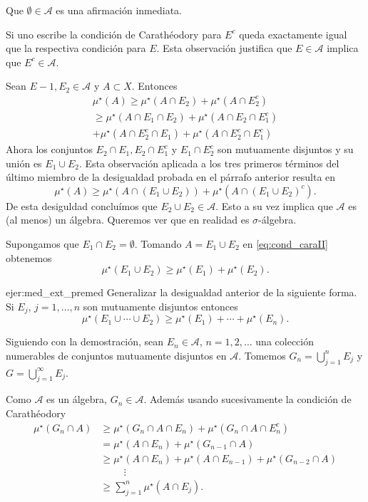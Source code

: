  \begin{demo} Que $\emptyset\in\mathscr{A}$ es una afirmación inmediata. 
 
 Si uno escribe la condición de Carathéodory para $E^c$ queda exactamente igual que la respectiva condición para $E$. Esta observación justifica que $E\in \mathscr{A}$ implica que $E^c\in\mathscr{A}$.
 
 Sean $E-1,E_2\in\mathscr{A}$ y $A\subset X$. Entonces
 \begin{multline*}
  \mu^\star(A)\geq  \mu^\star(A\cap E_2)+ \mu^\star(A\cap E_2^c)\\
  \geq \mu^\star(A\cap E_1\cap E_2)+ \mu^\star(A\cap E_2\cap E_1^c)\\
  + \mu^\star(A\cap E_2^c\cap E_1)+ \mu^\star(A\cap E_2^c\cap E_1^c)
 \end{multline*} 
Ahora los conjuntos $E_2\cap E_1, E_2\cap E_1^c$ y $E_1\cap E_2^c$ son mutuamente disjuntos  y su unión es $E_1\cup E_2$. Esta observación aplicada a los tres primeros términos del último miembro de la desigualdad probada en el párrafo anterior resulta en 
\[
  \mu^\star(A)\geq \mu^\star(A\cap (E_1\cup E_2))+ \mu^\star(A\cap (E_1\cup E_2)^c).
\]
De esta desiguldad concluímos que $E_2\cup E_2\in\mathscr{A}$. Esto a su vez implica que $\mathscr{A}$ es (al menos) un álgebra. Queremos ver que en realidad es $\sigma$-álgebra.

Supongamos que $E_1\cap E_2=\emptyset$. Tomando $A= E_1\cup E_2$ en \eqref{eq:cond_caraII} obtenemos
\[
 \mu^\star(E_1\cup E_2)\geq \mu^\star(E_1)+\mu^\star(E_2).
 \]

\begin{ejercicio}{ejer:med_ext_premed} Generalizar la desigualdad anterior de la siguiente forma. Si $E_j$, $j=1,\ldots,n$ son mutuamente disjuntos entonces
\[
 \mu^\star(E_1\cup\cdots\cup E_2)\geq \mu^\star(E_1)+\cdots+\mu^\star(E_n).
 \]
 \end{ejercicio}

Siguiendo con la demostración, sean $E_n\in\mathscr{A}$, $n=1,2,\ldots$ una colección numerables de conjuntos mutuamente disjuntos en $\mathscr{A}$. Tomemos $G_n=\bigcup_{j=1}^nE_j$ y $G=\bigcup_{j=1}^{\infty}E_j$.

Como $\mathscr{A}$ es un álgebra, $G_n\in\mathscr{A}$. Además usando sucesivamente la condición de Carathéodory
\begin{equation}\label{eq:dem_cara1}
\begin{split}
  \mu^\star(G_n\cap A) &\geq  \mu^\star(G_n\cap A\cap E_n)+ \mu^\star(G_n\cap A\cap E_n^c)\\
 &=\mu^\star( A\cap E_n)+ \mu^\star(G_{n-1}\cap A)\\
 &\geq \mu^\star( A\cap E_n)+ \mu^\star(A\cap E_{n-1})+ \mu^\star(G_{n-2}\cap A)\\
&\hspace{1cm}\vdots\\
&\geq \sum_{j=1}^n\mu^\star(A\cap E_j).
\end{split}
\end{equation}


\end{demo}
